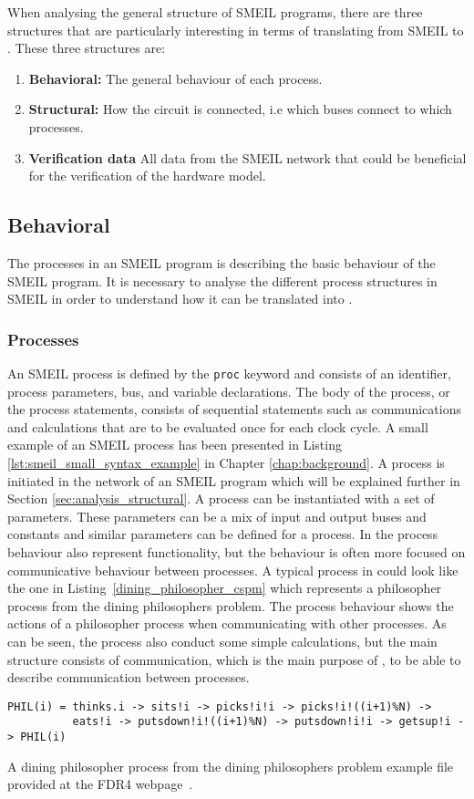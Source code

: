 When analysing the general structure of SMEIL programs, there are three structures that are particularly interesting in terms of translating from SMEIL to \cspm{}. These three structures are:
\begin{enumerate}
    \item \textbf{Behavioral:} The general behaviour of each process.
    \item \textbf{Structural:} How the circuit is connected, i.e which buses connect to which processes.
    \item \textbf{Verification data} All data from the SMEIL network that could be beneficial for the verification of the hardware model.
\end{enumerate}
\subsection{Behavioral}
The processes in an SMEIL program is describing the basic behaviour of the SMEIL program. It is necessary to analyse the different process structures in SMEIL in order to understand how it can be translated into \cspm{}.
\subsubsection{Processes}
An SMEIL process is defined by the \texttt{proc} keyword and consists of an identifier, process parameters, bus, and variable declarations. The body of the process, or the process statements, consists of sequential statements such as communications and calculations that are to be evaluated once for each clock cycle. A small example of an SMEIL process has been presented in Listing \ref{lst:smeil_small_syntax_example} in Chapter \ref{chap:background}. A process is initiated in the network of an SMEIL program which will be explained further in Section \ref{sec:analysis_structural}. A process can be instantiated with a set of parameters. These parameters can be a mix of input and output buses and constants and similar parameters can be defined for a \cspm{} process. In \cspm{} the process behaviour also represent functionality, but the behaviour is often more focused on communicative behaviour between processes.
A typical process in \cspm{} could look like the one in Listing~\ref{dining_philosopher_cspm} which represents a philosopher process from the dining philosophers problem. The process behaviour shows the actions of a philosopher process when communicating with other processes. As can be seen, the process also conduct some simple calculations, but the main structure consists of communication, which is the main purpose of \cspm{}, to be able to describe communication between processes.
\begin{listing}
\begin{verbatim}
PHIL(i) = thinks.i -> sits!i -> picks!i!i -> picks!i!((i+1)%N) ->
          eats!i -> putsdown!i!((i+1)%N) -> putsdown!i!i -> getsup!i -> PHIL(i)

\end{verbatim}
\caption{A dining philosopher process from the dining philosophers problem example file provided at the FDR4 webpage~\cite{fdr_example}.}
\label{dining_philosopher_cspm}
\end{listing}

